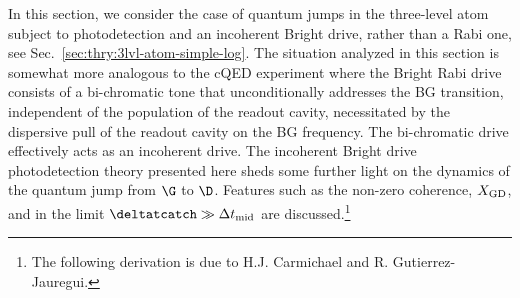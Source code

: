 In this section, we consider the case of quantum jumps in the three-level
atom subject to photodetection and an incoherent Bright drive, rather
than a Rabi one, see Sec.~\ref{sec:thry:3lvl-atom-simple-log}. The
situation analyzed in this section is somewhat more analogous to the
cQED experiment where the Bright Rabi drive consists of a bi-chromatic
tone that unconditionally addresses the BG transition, independent
of the population of the readout cavity, necessitated by the  dispersive
pull of the readout cavity on the BG frequency. The bi-chromatic drive
effectively acts as an incoherent drive. The incoherent Bright drive
photodetection theory presented here sheds some further light on the
dynamics of the quantum jump from $\G$ to $\D$. Features such as
the non-zero coherence, $X_{{\rm GD}}$, and in the limit $\deltatcatch\gg\Delta t_{{\rm mid}}$
are discussed.\footnote{The following derivation is due to H.J. Carmichael and R. Gutierrez-Jauregui.}


